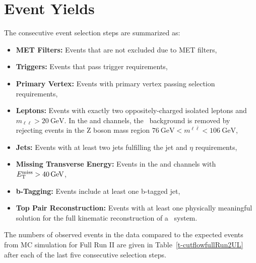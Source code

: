 \clearpage
\section{Event Yields}
The consecutive event selection steps are summarized as:
\begin{itemize}
    \item {\bf MET Filters:} Events that are not excluded due to MET filters,
    \item {\bf Triggers:} Events that pass trigger requirements,
    \item {\bf Primary Vertex:} Events with primary vertex passing selection requirements,
    \item {\bf Leptons:} Events with exactly two oppositely-charged isolated leptons and $m_{\ell\ell} > \SI{20}{\GeV}$.  
            In the \mumu and \ee channels, the \zjets\ background is removed by rejecting events in the Z boson mass region $\SI{76}{\GeV} < m^{\ell\bar{\ell}} < \SI{106}{\GeV}$,
    \item {\bf Jets:} Events with at least two jets fulfilling the jet \pT and $\eta$ requirements,
    \item {\bf Missing Transverse Energy:} Events in the \mumu and \ee channels with $\ETmiss > \SI{40}{\GeV}$,
    \item {\bf b-Tagging:} Events include at least one b-tagged jet,
    \item {\bf Top Pair Reconstruction:} Events with at least one physically meaningful solution for the full kinematic reconstruction of a \ttbar\ system.
\end{itemize}
The numbers of observed events in the data compared to the expected events from MC simulation for Full Run II are given in Table~\ref{t-cutflowfullRun2UL} after each of the last five consecutive selection steps.

